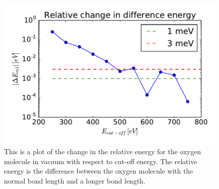 \begin{figure}[H]
\includegraphics[width=\linewidth]{../fig/oxygen/deltatotencurverel.pdf}\caption{This is a plot of the change in the relative energy for the oxygen molecule in vacuum with respect to cut-off energy. The relative energy is the difference between the oxygen molecule with the normal bond length and a longer bond length.}\label{fig:totencutoff_O2}
\end{figure}

